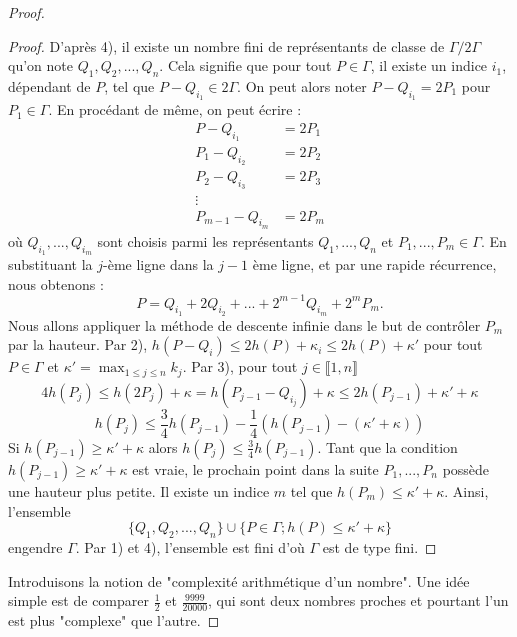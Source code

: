\documentclass[a4paper]{article}
\begin{document}
\begin{proof}
\begin{proof}
D'après 4), il existe un nombre fini de représentants de classe de $\Gamma / 2\Gamma$ qu'on note $Q_{1},Q_{2},...,Q_{n}$. Cela signifie que pour tout $P \in \Gamma$, il existe un indice $i_{1}$, dépendant de $P$, tel que $P-Q_{i_{1}} \in 2\Gamma$. On peut alors noter $P-Q_{i_{1}}=2P_{1}$ pour $P_{1} \in \Gamma$. En procédant de même, on peut écrire :
\begin{align*}
P-Q_{i_{1}}&=2P_{1} \\
P_{1}-Q_{i_{2}}&=2P_{2} \\
P_{2}-Q_{i_{3}}&=2P_{3} \\
\vdots \\
P_{m-1}-Q_{i_{m}}&=2P_{m}
\end{align*}
où $Q_{i_{1}},...,Q_{i_{m}}$ sont choisis parmi les représentants $Q_{1},...,Q_{n}$ et $P_{1},...,P_{m} \in \Gamma$.
En substituant la $j$-ème ligne dans la $j-1$ ème ligne, et par une rapide récurrence, nous obtenons :
\begin{equation*}
P=Q_{i_{1}}+2Q_{i_{2}}+...+2^{m-1}Q_{i_{m}}+2^mP_{m}.
\end{equation*}
Nous allons appliquer la méthode de descente infinie dans le but de contrôler $P_{m}$ par la hauteur.
Par 2), $h(P-Q_{i}) \leqslant 2h(P) + \kappa_{i} \leqslant 2h(P) + \kappa'$ pour tout $P \in \Gamma $ et $\kappa' =\displaystyle \max_{1 \leqslant j \leqslant n} k_{j}$. Par 3), pour tout $j \in  \llbracket 1,n \rrbracket$
\begin{equation*}
4h(P_{j}) \leqslant h(2P_{j})+\kappa=h(P_{j-1}-Q_{i_{j}})+\kappa \leqslant
2h(P_{j-1})+\kappa'+\kappa
\end{equation*}
\begin{equation*}
h(P_{j}) \leqslant \frac{3}{4}h(P_{j-1})-\frac{1}{4}(h(P_{j-1})-(\kappa'+\kappa))
\end{equation*}
Si $h(P_{j-1})\geqslant \kappa'+\kappa$ alors $h(P_{j}) \leqslant \frac{3}{4}h(P_{j-1})$. Tant que la condition  $h(P_{j-1})\geqslant \kappa'+\kappa$ est vraie, le prochain point dans la suite $P_{1},...,P_{n}$ possède une hauteur plus petite. Il existe un indice $m$ tel que $h(P_{m}) \leqslant \kappa'+\kappa$.
Ainsi, l'ensemble
\begin{equation*}
\{Q_{1},Q_{2},...,Q_{n}\} \cup \{P \in \Gamma ; h(P) \leqslant \kappa'+\kappa\}
\end{equation*}
engendre $\Gamma$. Par 1) et 4), l'ensemble est fini d'où $\Gamma$ est de type fini.
\end{proof}
\noindent Introduisons la notion de "complexité arithmétique d'un nombre". Une idée simple est de comparer $\frac{1}{2}$ et $\frac{9999}{20000}$, qui sont deux nombres proches et pourtant l'un est plus "complexe" que l'autre.


\end{proof}
\end{document}
